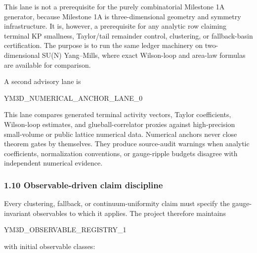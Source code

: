 \documentclass[
]{article}
\newenvironment{Shaded}{}{}
\newcommand{\NormalTok}[1]{#1}
\begin{document}
This lane is not a prerequisite for the purely combinatorial Milestone
1A generator, because Milestone 1A is three-dimensional geometry and
symmetry infrastructure. It is, however, a prerequisite for any analytic
row claiming terminal KP smallness, Taylor/tail remainder control,
clustering, or fallback-basin certification. The purpose is to run the
same ledger machinery on two-dimensional SU(N) Yang--Mills, where exact
Wilson-loop and area-law formulas are available for comparison.

A second advisory lane is

\begin{Shaded}
\begin{Highlighting}[]
\NormalTok{YM3D\_NUMERICAL\_ANCHOR\_LANE\_0}
\end{Highlighting}
\end{Shaded}

This lane compares generated terminal activity vectors, Taylor
coefficients, Wilson-loop estimates, and glueball-correlator proxies
against high-precision small-volume or public lattice numerical data.
Numerical anchors never close theorem gates by themselves. They produce
source-audit warnings when analytic coefficients, normalization
conventions, or gauge-ripple budgets disagree with independent numerical
evidence.

\subsubsection{1.10 Observable-driven claim
discipline}\label{observable-driven-claim-discipline}

Every clustering, fallback, or continuum-uniformity claim must specify
the gauge-invariant observables to which it applies. The project
therefore maintains

\begin{Shaded}
\begin{Highlighting}[]
\NormalTok{YM3D\_OBSERVABLE\_REGISTRY\_1}
\end{Highlighting}
\end{Shaded}

with initial observable classes:
\end{document}
